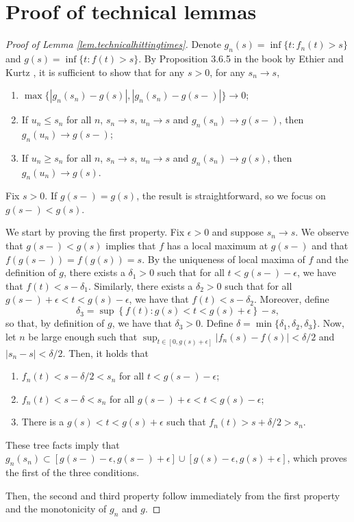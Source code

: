 \section{Proof of technical lemmas}\label{app.technical}
\begin{proof}[Proof of Lemma \ref{lem.technicalhittingtimes}]
Denote $g_n(s)=\inf\{t:f_n(t)>s\}$ and $g(s)=\inf\{t:f(t)>s\}$. By Proposition 3.6.5 in the book by Ethier and Kurtz \cite{ethierMarkovProcessesCharacterization1986}, it is sufficient to show that for any $s>0$, for any $s_n\to s$, 
\begin{enumerate}
    \item $\max\{|g_n(s_n)-g(s)|,|g_n(s_n)-g(s-)|\}\to 0$;
    \item If $u_n\leq s_n$ for all $n$, $s_n\to s$, $u_n\to s$ and $g_n(s_n)\to g(s-)$, then $g_n(u_n)\to g(s-)$;
    \item If $u_n\geq s_n$ for all $n$, $s_n\to s$, $u_n\to s$ and $g_n(s_n)\to g(s)$, then $g_n(u_n)\to g(s)$. 
\end{enumerate}
Fix $s>0$. If $g(s-)=g(s)$, the result is straightforward, so we focus on $g(s-)<g(s)$.  

We start by proving the first property. Fix $\epsilon>0$ and suppose $s_n\to s$. We observe that $g(s-)<g(s)$ implies that $f$ has a local maximum at $g(s-)$ and that $f(g(s-))=f(g(s))=s$. By the uniqueness of local maxima of $f$ and the definition of $g$, there exists a $\delta_1>0$ such that for all $t<g(s-)-\epsilon$, we have that $f(t)<s-\delta_1$. Similarly, there exists a $\delta_2>0$ such that for all $g(s-)+\epsilon<t<g(s)-\epsilon$, we have that $f(t)<s-\delta_2$. Moreover, define $$\delta_3=\sup\left\{f(t):g(s)<t<g(s)+\epsilon\right\}-s,$$ so that, by definition of $g$, we have that $\delta_3>0$. Define $\delta=\min\{\delta_1,\delta_2,\delta_3\}$. 
Now, let $n$ be large enough such that $\sup_{t\in [0,g(s)+\epsilon]}|f_n(s)-f(s)|<\delta/2$ and $|s_n-s|<\delta/2$. 
Then, it holds that 
\begin{enumerate}
    \item $f_n(t)<s-\delta/2<s_n$ for all $t<g(s-)-\epsilon$;
    \item $f_n(t)<s-\delta<s_n$ for all $g(s-)+\epsilon<t<g(s)-\epsilon$;
    \item There is a $g(s)<t<g(s)+\epsilon$ such that $f_n(t)>s+\delta/2>s_n$.
\end{enumerate}
These tree facts imply that $g_n(s_n)\subset [g(s-)-\epsilon,g(s-)+\epsilon]\cup[g(s)-\epsilon,g(s)+\epsilon]$, which proves the first of the three conditions.

Then, the second and third property follow immediately from the first property and the monotonicity of $g_n$ and $g$. \end{proof}

